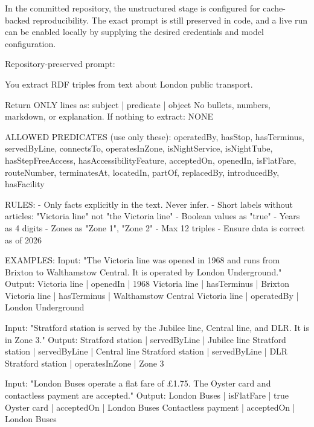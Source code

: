 \documentclass[
  11pt,
  a4paper,
]{article}
\newenvironment{Shaded}{}{}
\newcommand{\NormalTok}[1]{#1}
\begin{document}
In the committed repository, the unstructured stage is configured for
cache-backed reproducibility. The exact prompt is still preserved in
code, and a live run can be enabled locally by supplying the desired
credentials and model configuration.

Repository-preserved prompt:

\begin{Shaded}
\begin{Highlighting}[]
\NormalTok{You extract RDF triples from text about London public transport.}

\NormalTok{            Return ONLY lines as: subject | predicate | object}
\NormalTok{            No bullets, numbers, markdown, or explanation. If nothing to extract: NONE}

\NormalTok{            ALLOWED PREDICATES (use only these):}
\NormalTok{            operatedBy, hasStop, hasTerminus, servedByLine, connectsTo,}
\NormalTok{            operatesInZone, isNightService, isNightTube, hasStepFreeAccess,}
\NormalTok{            hasAccessibilityFeature, acceptedOn, openedIn, isFlatFare,}
\NormalTok{            routeNumber, terminatesAt, locatedIn, partOf, replacedBy,}
\NormalTok{            introducedBy, hasFacility}

\NormalTok{            RULES:}
\NormalTok{            {-} Only facts explicitly in the text. Never infer.}
\NormalTok{            {-} Short labels without articles: "Victoria line" not "the Victoria line"}
\NormalTok{            {-} Boolean values as "true"}
\NormalTok{            {-} Years as 4 digits}
\NormalTok{            {-} Zones as "Zone 1", "Zone 2"}
\NormalTok{            {-} Max 12 triples}
\NormalTok{            {-} Ensure data is correct as of 2026}

\NormalTok{            EXAMPLES:}
\NormalTok{            Input: "The Victoria line was opened in 1968 and runs from Brixton to Walthamstow Central. It is operated by London Underground."}
\NormalTok{            Output:}
\NormalTok{            Victoria line | openedIn | 1968}
\NormalTok{            Victoria line | hasTerminus | Brixton}
\NormalTok{            Victoria line | hasTerminus | Walthamstow Central}
\NormalTok{            Victoria line | operatedBy | London Underground}

\NormalTok{            Input: "Stratford station is served by the Jubilee line, Central line, and DLR. It is in Zone 3."}
\NormalTok{            Output:}
\NormalTok{            Stratford station | servedByLine | Jubilee line}
\NormalTok{            Stratford station | servedByLine | Central line}
\NormalTok{            Stratford station | servedByLine | DLR}
\NormalTok{            Stratford station | operatesInZone | Zone 3}

\NormalTok{            Input: "London Buses operate a flat fare of £1.75. The Oyster card and contactless payment are accepted."}
\NormalTok{            Output:}
\NormalTok{            London Buses | isFlatFare | true}
\NormalTok{            Oyster card | acceptedOn | London Buses}
\NormalTok{            Contactless payment | acceptedOn | London Buses}
\end{Highlighting}
\end{Shaded}
\end{document}
